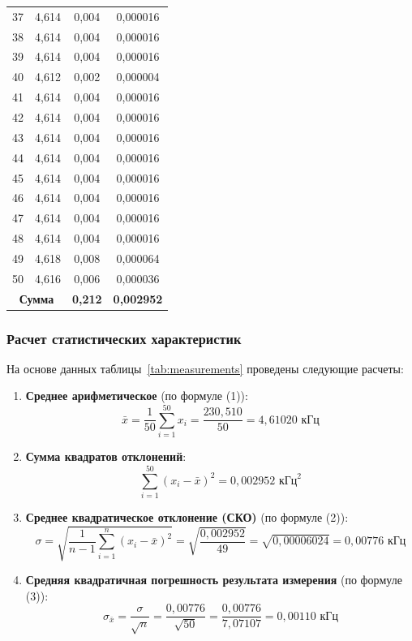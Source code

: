 \begin{longtable}{|c|c|c|c|}
37 & 4,614 & 0,004 & 0,000016 \\
38 & 4,614 & 0,004 & 0,000016 \\
39 & 4,614 & 0,004 & 0,000016 \\
40 & 4,612 & 0,002 & 0,000004 \\
41 & 4,614 & 0,004 & 0,000016 \\
42 & 4,614 & 0,004 & 0,000016 \\
43 & 4,614 & 0,004 & 0,000016 \\
44 & 4,614 & 0,004 & 0,000016 \\
45 & 4,614 & 0,004 & 0,000016 \\
46 & 4,614 & 0,004 & 0,000016 \\
47 & 4,614 & 0,004 & 0,000016 \\
48 & 4,614 & 0,004 & 0,000016 \\
49 & 4,618 & 0,008 & 0,000064 \\
50 & 4,616 & 0,006 & 0,000036 \\
\hline
\multicolumn{2}{|c|}{\textbf{Сумма}} & \textbf{0,212} & \textbf{0,002952} \\
\hline
\end{longtable}

\subsubsection{Расчет статистических характеристик}

На основе данных таблицы~\ref{tab:measurements} проведены следующие расчеты:

\begin{enumerate}
    \item \textbf{Среднее арифметическое} (по формуле (1)):
    \[
    \bar{x} = \frac{1}{50}\sum_{i=1}^{50} x_i = \frac{230,510}{50} = 4,61020 \text{ кГц}
    \]
    
    \item \textbf{Сумма квадратов отклонений}:
    \[
    \sum_{i=1}^{50} (x_i - \bar{x})^2 = 0,002952 \text{ кГц}^2
    \]
    
    \item \textbf{Среднее квадратическое отклонение (СКО)} (по формуле (2)):
    \[
    \sigma = \sqrt{\frac{1}{n-1}\sum_{i=1}^{n} (x_i - \bar{x})^2} = \sqrt{\frac{0,002952}{49}} = \sqrt{0,00006024} = 0,00776 \text{ кГц}
    \]
    
    \item \textbf{Средняя квадратичная погрешность результата измерения} (по формуле (3)):
    \[
    \sigma_{\bar{x}} = \frac{\sigma}{\sqrt{n}} = \frac{0,00776}{\sqrt{50}} = \frac{0,00776}{7,07107} = 0,00110 \text{ кГц}
    \]
\end{enumerate}

